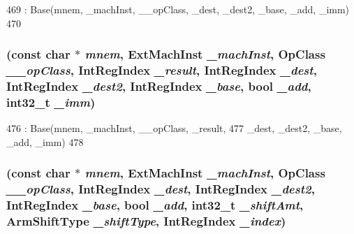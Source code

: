 \begin{DoxyCode}
469         : Base(mnem, _machInst, __opClass, _dest, _dest2, _base, _add, _imm)
470     {}
\end{DoxyCode}
\hypertarget{classArmISA_1_1MemoryPostIndex_a33785e2c522637e99435373031ba610f}{
\subsubsection[{MemoryPostIndex}]{ (const char $\ast$ {\em mnem}, \/  ExtMachInst {\em \_\-machInst}, \/  OpClass {\em \_\-\_\-opClass}, \/  {\bf IntRegIndex} {\em \_\-result}, \/  {\bf IntRegIndex} {\em \_\-dest}, \/  {\bf IntRegIndex} {\em \_\-dest2}, \/  {\bf IntRegIndex} {\em \_\-base}, \/  bool {\em \_\-add}, \/  int32\_\-t {\em \_\-imm})}}
\label{classArmISA_1_1MemoryPostIndex_a33785e2c522637e99435373031ba610f}



\begin{DoxyCode}
476         : Base(mnem, _machInst, __opClass, _result,
477                 _dest, _dest2, _base, _add, _imm)
478     {}
\end{DoxyCode}
\hypertarget{classArmISA_1_1MemoryPostIndex_ace649d298aca063b81670c1fae087ff6}{
\subsubsection[{MemoryPostIndex}]{ (const char $\ast$ {\em mnem}, \/  ExtMachInst {\em \_\-machInst}, \/  OpClass {\em \_\-\_\-opClass}, \/  {\bf IntRegIndex} {\em \_\-dest}, \/  {\bf IntRegIndex} {\em \_\-dest2}, \/  {\bf IntRegIndex} {\em \_\-base}, \/  bool {\em \_\-add}, \/  int32\_\-t {\em \_\-shiftAmt}, \/  {\bf ArmShiftType} {\em \_\-shiftType}, \/  {\bf IntRegIndex} {\em \_\-index})}}
\label{classArmISA_1_1MemoryPostIndex_ace649d298aca063b81670c1fae087ff6}



